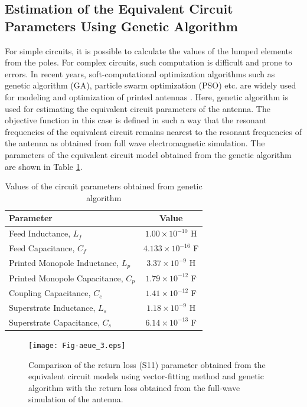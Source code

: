 \subsection{Estimation of the Equivalent Circuit Parameters Using Genetic Algorithm}
For simple circuits, it is possible to calculate the values of the lumped elements from the poles. For complex circuits, such computation is difficult and prone to errors. In recent years, soft-computational optimization algorithms such as genetic algorithm (GA), particle swarm optimization (PSO) etc. are widely used for modeling and optimization of printed antennas \cite{antSoftAppReview}. Here, genetic algorithm is used for estimating the equivalent circuit parameters of the antenna. The objective function in this case is defined in such a way that the resonant frequencies of the equivalent circuit remains nearest to the resonant frequencies of the antenna as obtained from full wave electromagnetic simulation. The parameters of the equivalent circuit model obtained from the genetic algorithm are shown in Table \ref{table_eqckt}.

\begin{table}
\centering
\caption{Values of the circuit parameters obtained from genetic algorithm}\label{table_eqckt}
\begin{tabular}{|l|c|}
\hline
Parameter & Value \\ \hline
Feed Inductance, $L_f$ & $1.00 \times 10^{-10}$ H \\ \hline
Feed Capacitance, $C_f$ & $4.133 \times 10^{-16}$ F \\ \hline
Printed Monopole Inductance, $L_p$ & $3.37 \times 10^{-9}$ H \\ \hline
Printed Monopole Capacitance, $C_p$ & $1.79 \times 10^{-12}$ F \\ \hline
Coupling Capacitance, $C_c$ & $1.41 \times 10^{-12}$ F \\ \hline
Superstrate Inductance, $L_s$ & $1.18 \times 10^{-9}$ H \\ \hline
Superstrate Capacitance, $C_s$ & $6.14 \times 10^{-13}$ F \\ \hline
\end{tabular}
\end{table}

\begin{figure}
\centering
\texttt{[image: Fig-aeue\_3.eps]}
\caption{Comparison of the return loss (S11) parameter obtained from the equivalent circuit models using vector-fitting method and genetic algorithm with the return loss obtained from the full-wave simulation of the antenna.}\label{fig_vc_ga}
\end{figure}

